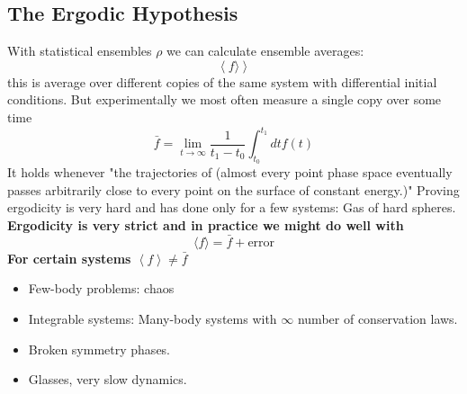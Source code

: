 \documentclass[11pt]{book}
\theoremstyle{definition}
\begin{document}
\subsection{The Ergodic Hypothesis}
With statistical ensembles $ \rho $ we can calculate ensemble averages:
\[ \left \langle f \rangle \right> \] this is average over different copies of the same system with differential initial conditions. But experimentally we most often measure a single copy over some time
	\[\bar f = \lim_{t \to \infty} \frac{1}{t_1-t_0} \int_{t_0}^{t_1} dt f(t) \] 
It holds whenever "the trajectories of (almost every point phase space eventually passes arbitrarily close to every point on the surface of constant energy.)"
Proving ergodicity is very hard and has done only for a few systems: Gas of hard spheres. \\
\textbf{Ergodicity is very strict and in practice we might do well with} 
\[ \langle f \rangle  = \bar f + \text{error} \] 
\textbf{For certain systems $ \left \langle f \right \rangle \neq \bar f $ } 
\begin{itemize}
	\item Few-body problems: chaos
	\item Integrable systems: Many-body systems with $ \infty $ number of conservation laws.
	\item Broken symmetry phases.
	\item Glasses, very slow dynamics.
\end{itemize}
\end{document}

